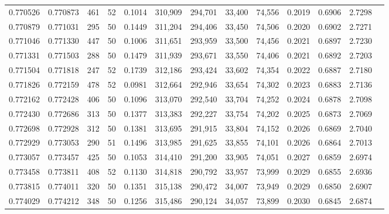 \begin{tabular}{rrrrrrrrrrrrr}
0.770526 & 0.770873 &   461 &  52 &                                     0.1014 & 310,909 & 294,701 &  33,400 &  74,556 & 0.2019 & 0.6906 & 2.7298 \\
0.770879 & 0.771031 &   295 &  50 &                                     0.1449 & 311,204 & 294,406 &  33,450 &  74,506 & 0.2020 & 0.6902 & 2.7271 \\
0.771046 & 0.771330 &   447 &  50 &                                     0.1006 & 311,651 & 293,959 &  33,500 &  74,456 & 0.2021 & 0.6897 & 2.7230 \\
0.771331 & 0.771503 &   288 &  50 &                                     0.1479 & 311,939 & 293,671 &  33,550 &  74,406 & 0.2021 & 0.6892 & 2.7203 \\
0.771504 & 0.771818 &   247 &  52 &                                     0.1739 & 312,186 & 293,424 &  33,602 &  74,354 & 0.2022 & 0.6887 & 2.7180 \\
0.771826 & 0.772159 &   478 &  52 &                                     0.0981 & 312,664 & 292,946 &  33,654 &  74,302 & 0.2023 & 0.6883 & 2.7136 \\
0.772162 & 0.772428 &   406 &  50 &                                     0.1096 & 313,070 & 292,540 &  33,704 &  74,252 & 0.2024 & 0.6878 & 2.7098 \\
0.772430 & 0.772686 &   313 &  50 &                                     0.1377 & 313,383 & 292,227 &  33,754 &  74,202 & 0.2025 & 0.6873 & 2.7069 \\
0.772698 & 0.772928 &   312 &  50 &                                     0.1381 & 313,695 & 291,915 &  33,804 &  74,152 & 0.2026 & 0.6869 & 2.7040 \\
0.772929 & 0.773053 &   290 &  51 &                                     0.1496 & 313,985 & 291,625 &  33,855 &  74,101 & 0.2026 & 0.6864 & 2.7013 \\
0.773057 & 0.773457 &   425 &  50 &                                     0.1053 & 314,410 & 291,200 &  33,905 &  74,051 & 0.2027 & 0.6859 & 2.6974 \\
0.773458 & 0.773811 &   408 &  52 &                                     0.1130 & 314,818 & 290,792 &  33,957 &  73,999 & 0.2029 & 0.6855 & 2.6936 \\
0.773815 & 0.774011 &   320 &  50 &                                     0.1351 & 315,138 & 290,472 &  34,007 &  73,949 & 0.2029 & 0.6850 & 2.6907 \\
0.774029 & 0.774212 &   348 &  50 &                                     0.1256 & 315,486 & 290,124 &  34,057 &  73,899 & 0.2030 & 0.6845 & 2.6874 \\

\end{tabular}
